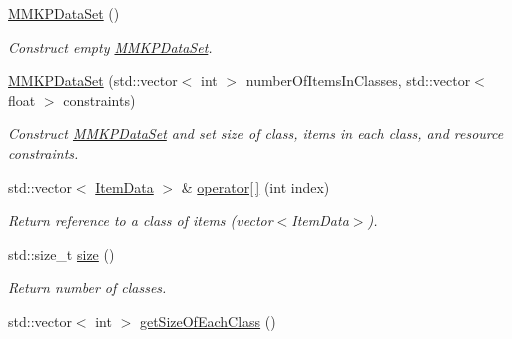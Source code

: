 \begin{DoxyCompactItemize}
\item 
\hypertarget{class_m_m_k_p_data_set_ae16db6c0fd863fbfded5c0b89c1efda7}{\hyperlink{class_m_m_k_p_data_set_ae16db6c0fd863fbfded5c0b89c1efda7}{M\+M\+K\+P\+Data\+Set} ()}\label{class_m_m_k_p_data_set_ae16db6c0fd863fbfded5c0b89c1efda7}

\begin{DoxyCompactList}\small\item\em Construct empty \hyperlink{class_m_m_k_p_data_set}{M\+M\+K\+P\+Data\+Set}. \end{DoxyCompactList}\item 
\hypertarget{class_m_m_k_p_data_set_af933fabdd9bbf50a567398699380566d}{\hyperlink{class_m_m_k_p_data_set_af933fabdd9bbf50a567398699380566d}{M\+M\+K\+P\+Data\+Set} (std\+::vector$<$ int $>$ number\+Of\+Items\+In\+Classes, std\+::vector$<$ float $>$ constraints)}\label{class_m_m_k_p_data_set_af933fabdd9bbf50a567398699380566d}

\begin{DoxyCompactList}\small\item\em Construct \hyperlink{class_m_m_k_p_data_set}{M\+M\+K\+P\+Data\+Set} and set size of class, items in each class, and resource constraints. \end{DoxyCompactList}\item 
std\+::vector$<$ \hyperlink{class_item_data}{Item\+Data} $>$ \& \hyperlink{class_m_m_k_p_data_set_addb4470837093cd0207410348576f74a}{operator\mbox{[}$\,$\mbox{]}} (int index)
\begin{DoxyCompactList}\small\item\em Return reference to a class of items (vector$<$\+Item\+Data$>$). \end{DoxyCompactList}\item 
\hypertarget{class_m_m_k_p_data_set_a547ee45e82cb8ed99f019debd6c08480}{std\+::size\+\_\+t \hyperlink{class_m_m_k_p_data_set_a547ee45e82cb8ed99f019debd6c08480}{size} ()}\label{class_m_m_k_p_data_set_a547ee45e82cb8ed99f019debd6c08480}

\begin{DoxyCompactList}\small\item\em Return number of classes. \end{DoxyCompactList}\item 
\hypertarget{class_m_m_k_p_data_set_a337ea53a32b4aea7a2c19e985a57f484}{std\+::vector$<$ int $>$ \hyperlink{class_m_m_k_p_data_set_a337ea53a32b4aea7a2c19e985a57f484}{get\+Size\+Of\+Each\+Class} ()}\label{class_m_m_k_p_data_set_a337ea53a32b4aea7a2c19e985a57f484}


\end{DoxyCompactItemize}
